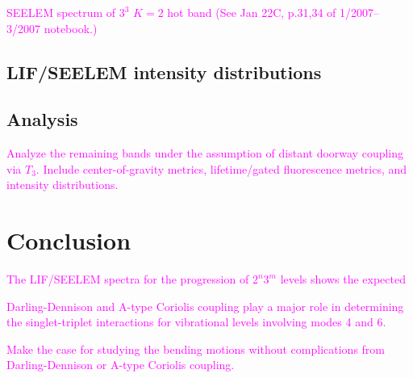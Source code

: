 \documentclass[12pt]{mitthesis}
\newcommand{\POINT}[1]{\textcolor{magenta}{#1}}
\begin{document}
\POINT{SEELEM spectrum of $3^3$ $K=2$ hot band (See Jan 22C, p.31,34
  of 1/2007--3/2007 notebook.)}

\subsection{LIF/SEELEM intensity distributions}

\subsection{Analysis}

\POINT{Analyze the remaining bands under the assumption of distant
  doorway coupling via $T_3$.  Include center-of-gravity metrics,
  lifetime/gated fluorescence metrics, and intensity distributions.}

\section{Conclusion}

\POINT{The LIF/SEELEM spectra for the progression of $2^n3^m$ levels
  shows the expected}

\POINT{Darling-Dennison and A-type Coriolis coupling play a major role
  in determining the singlet-triplet interactions for vibrational
  levels involving modes 4 and 6.}

\POINT{Make the case for studying the bending motions without
  complications from Darling-Dennison or A-type Coriolis coupling.}
\end{document}
